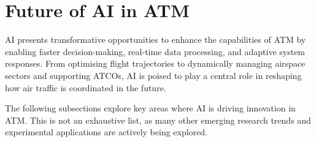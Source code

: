 \section{Future of AI in ATM}

\Gls{AI} presents transformative opportunities to enhance the capabilities of ATM by enabling faster decision-making, real-time data processing, and adaptive system responses. 
From optimising flight trajectories to dynamically managing airspace sectors and supporting \glspl{ATCO}, \gls{AI} is poised to play a central role in reshaping how air traffic is coordinated in the future. 

The following subsections explore key areas where \gls{AI} is driving innovation in \gls{ATM}.
This is not an exhaustive list, as many other emerging research trends and experimental applications are actively being explored.




